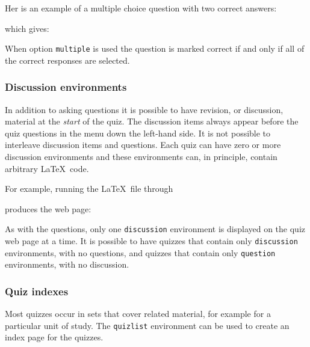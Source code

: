 \documentclass[svgnames]{article}
\begin{document}
Her is an example of a multiple choice question
with two correct answers:

  

\noindent which gives:


When option \Verb|multiple| is used the question is marked correct if
and only if all of the correct responses are selected.

  \subsubsection{Discussion environments}

In addition to asking questions it is possible to have revision, or
discussion, material at the \textit{start} of the quiz.  The discussion
items always appear before the quiz questions in the menu down the
left-hand side. It is not possible to interleave discussion items and
questions. Each quiz can have zero or more discussion environments and
these environments can, in principle, contain arbitrary \LaTeX\ code.

For example, running the \LaTeX\ file through \MathQuiz

  

produces the web page:


As with the questions, only one \Verb|discussion| environment is
displayed on the quiz web page at a time. It is possible to have quizzes
that contain only \Verb|discussion| environments, with no questions, and
quizzes that contain only \Verb|question| environments, with no
discussion.

  \subsubsection{Quiz indexes}


  Most quizzes occur in sets that cover related material, for example
  for a particular unit of study. The \Verb|quizlist| environment can be
  used to create an index page for the quizzes.

  
\end{document}
